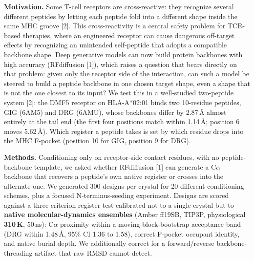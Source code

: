 \documentclass[11pt,twocolumn,letterpaper]{article}
\begin{document}

\noindent\textbf{Motivation.}
Some T-cell receptors are cross-reactive: they recognize several different peptides by letting each peptide
fold into a different shape inside the same MHC groove [2]. This cross-reactivity is a central safety
problem for TCR-based therapies, where an engineered receptor can cause dangerous off-target effects by
recognizing an unintended self-peptide that adopts a compatible backbone shape. Deep generative models can
now build protein backbones with high accuracy (RFdiffusion [1]), which raises a question that bears
directly on that problem: given only the receptor side of the interaction, can such a model be steered to
build a peptide backbone in one chosen target shape, even a shape that is not the one closest to its input? We test this in a well-studied two-peptide system [2]: the
DMF5 receptor on HLA-A*02:01 binds two 10-residue peptides, GIG (6AM5) and DRG (6AMU), whose backbones
differ by 2.87\,\AA{} almost entirely at the tail end (the first four positions match within 1.14\,\AA;
position 6 moves 5.62\,\AA). Which register a peptide takes is set by which residue drops into the MHC
F-pocket (position 10 for GIG, position 9 for DRG).

\noindent\textbf{Methods.}
Conditioning only on receptor-side contact residues, with no peptide-backbone template, we asked whether
RFdiffusion [1] can generate a C$\alpha$ backbone that recovers a peptide's own native register or crosses
into the alternate one. We generated 300 designs per crystal for 20 different conditioning schemes, plus a
focused N-terminus-seeding experiment. Designs are scored against a three-criterion register test calibrated
not to a single crystal but to \textbf{native molecular-dynamics ensembles} (Amber ff19SB, TIP3P,
physiological \textbf{310\,K}, 50\,ns): C$\alpha$ proximity within a moving-block-bootstrap acceptance band
(DRG within 1.48\,\AA, 95\% CI 1.36 to 1.58), correct F-pocket occupant identity, and native burial depth.
We additionally correct for a forward/reverse backbone-threading artifact that raw RMSD cannot detect.
\end{document}
